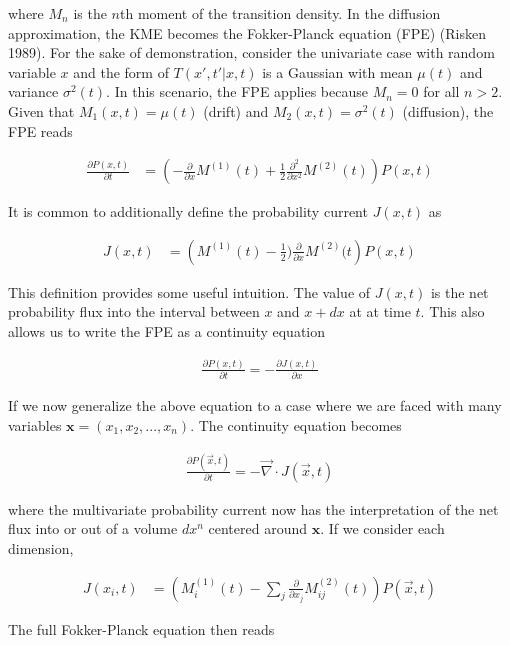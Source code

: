 \documentclass{article}
\begin{document}
where $M_{n}$ is the $n$th moment of the transition density. In the diffusion approximation, the KME becomes the Fokker-Planck equation (FPE) (Risken 1989). For the sake of demonstration, consider the univariate case with random variable $x$ and the form of $T(x',t'|x,t)$ is a Gaussian with mean $\mu(t)$ and variance $\sigma^{2}(t)$. In this scenario, the FPE applies because $M_{n} = 0$ for all $n > 2$. Given that $M_{1}(x,t) = \mu(t)$ (drift) and $M_{2}(x,t) = \sigma^{2}(t)$ (diffusion), the FPE reads

\begin{align}
\frac{\partial P(x,t)}{\partial t}  &= \left(-\frac{\partial}{\partial x}M^{(1)}(t) + \frac{1}{2}\frac{\partial^{2}}{\partial x^{2}}M^{(2)}(t)\right)P(x,t)
\end{align}

It is common to additionally define the probability current $J(x,t)$ as 

\begin{align}
J(x,t)  &= \left(M^{(1)}(t) - \frac{1}{2})\frac{\partial}{\partial x}M^{(2)}(t\right)P(x,t)
\end{align}

This definition provides some useful intuition. The value of $J(x,t)$ is the net probability flux into the interval between $x$ and $x+dx$ at at time $t$. This also allows us to write the FPE as a continuity equation

\begin{align}
\frac{\partial P(x,t)}{\partial t} = -\frac{\partial J(x,t)}{\partial x}
\end{align}


If we now generalize the above equation to a case where we are faced with many variables $\bm{x} = (x_{1},x_{2},...,x_{n})$. The continuity equation becomes 

\begin{align}
\frac{\partial P(\vec{x},t)}{\partial t} = -\vec{\nabla} \cdot J(\vec{x},t)
\end{align}

where the multivariate probability current now has the interpretation of the net flux into or out of a volume $dx^{n}$ centered around $\bm{x}$. If we consider each dimension, 

\begin{align}
J(x_{i},t)  &= \left(M_{i}^{(1)}(t) - \sum_{j}\frac{\partial}{\partial x_{j}}M_{ij}^{(2)}(t) \right)P(\vec{x},t)
\end{align}

The full Fokker-Planck equation then reads
\end{document}

